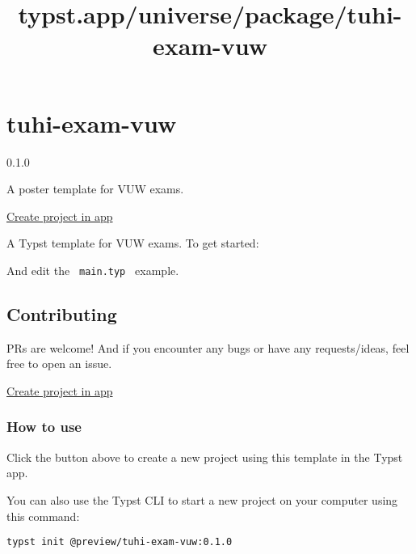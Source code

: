 \title{typst.app/universe/package/tuhi-exam-vuw}

\label{banner}
\label{template-thumbnail}

\section{tuhi-exam-vuw}\label{tuhi-exam-vuw}

{ 0.1.0 }

A poster template for VUW exams.

\href{/app?template=tuhi-exam-vuw&version=0.1.0}{Create project in app}

\label{readme}
A Typst template for VUW exams. To get started:

\begin{Shaded}
\begin{Highlighting}[]
\end{Highlighting}
\end{Shaded}

And edit the \texttt{\ main.typ\ } example.


\subsection{Contributing}\label{contributing}

PRs are welcome! And if you encounter any bugs or have any
requests/ideas, feel free to open an issue.

\href{/app?template=tuhi-exam-vuw&version=0.1.0}{Create project in app}

\subsubsection{How to use}\label{how-to-use}

Click the button above to create a new project using this template in
the Typst app.

You can also use the Typst CLI to start a new project on your computer
using this command:

\begin{verbatim}
typst init @preview/tuhi-exam-vuw:0.1.0
\end{verbatim}

